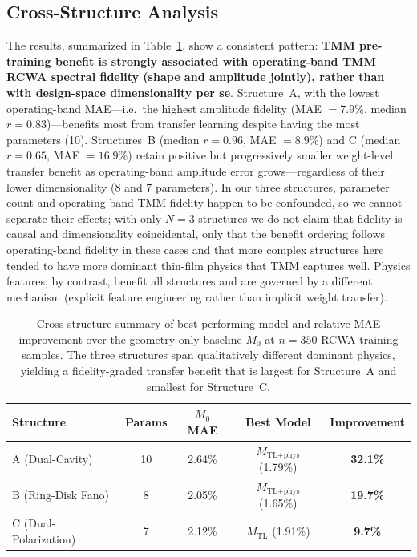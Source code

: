 \documentclass[a4paper,fleqn]{cas-sc}
\newcommand{\Mzero}{M_0}
\newcommand{\Mtl}{M_\text{TL}}
\newcommand{\Mtlphys}{M_\text{TL+phys}}
\begin{document}
\subsection{Cross-Structure Analysis}
\label{sec:cross_structure}


The results, summarized in Table~\ref{tab:summary_350}, show a consistent pattern: \textbf{TMM pre-training benefit is strongly associated with operating-band TMM--RCWA spectral fidelity (shape and amplitude jointly), rather than with design-space dimensionality per se}. Structure~A, with the lowest operating-band MAE---i.e.\ the highest amplitude fidelity (MAE $=7.9\%$, median $r=0.83$)---benefits most from transfer learning despite having the most parameters (10). Structures~B (median $r=0.96$, MAE $=8.9\%$) and C (median $r=0.65$, MAE $=16.9\%$) retain positive but progressively smaller weight-level transfer benefit as operating-band amplitude error grows---regardless of their lower dimensionality (8 and 7 parameters). In our three structures, parameter count and operating-band TMM fidelity happen to be confounded, so we cannot separate their effects; with only $N=3$ structures we do not claim that fidelity is causal and dimensionality coincidental, only that the benefit ordering follows operating-band fidelity in these cases and that more complex structures here tended to have more dominant thin-film physics that TMM captures well. Physics features, by contrast, benefit all structures and are governed by a different mechanism (explicit feature engineering rather than implicit weight transfer).

\begin{table}[htbp]\centering\small
\caption{Cross-structure summary of best-performing model and relative MAE improvement over the geometry-only baseline $\Mzero$ at $n=350$ RCWA training samples. The three structures span qualitatively different dominant physics, yielding a fidelity-graded transfer benefit that is largest for Structure~A and smallest for Structure~C.}
\label{tab:summary_350}
\begin{tabular}{lcccc}\toprule
\textbf{Structure} & \textbf{Params} & $\Mzero$ MAE & \textbf{Best Model} & \textbf{Improvement}\\\midrule
A (Dual-Cavity)       & 10 & 2.64\% & $\Mtlphys$ (1.79\%) & \textbf{32.1\%}\\
B (Ring-Disk Fano)    & 8  & 2.05\% & $\Mtlphys$ (1.65\%) & \textbf{19.7\%}\\
C (Dual-Polarization) & 7  & 2.12\% & $\Mtl$ (1.91\%) & \textbf{9.7\%}\\\bottomrule
\end{tabular}
\end{table}
\end{document}
